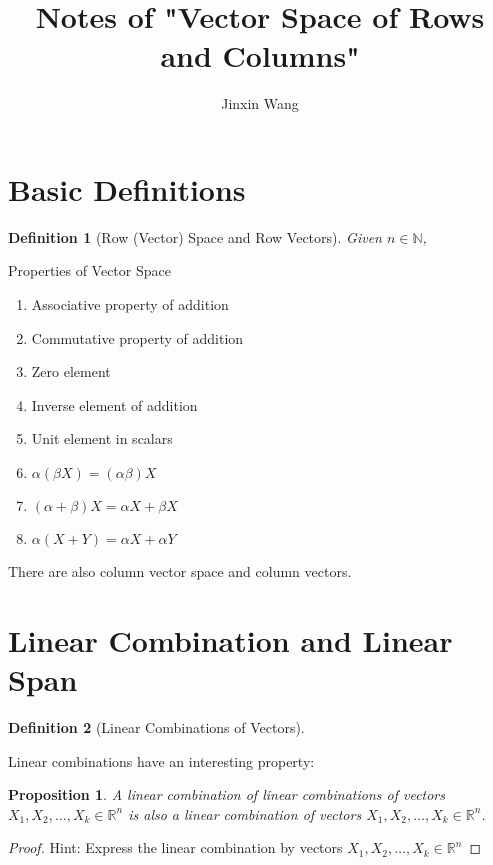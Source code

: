 \documentclass[onecolumn]{ctexart}
\title{Notes of "Vector Space of Rows and Columns"}
\author{Jinxin Wang}
\date{}
\newtheorem{definition}{Definition}
\newtheorem{proposition}{Proposition}
\begin{document}
\maketitle

\section{Basic Definitions}

\begin{definition}[Row (Vector) Space and Row Vectors]
  Given $n \in \mathbb{N}$, 
\end{definition}

Properties of Vector Space
\begin{enumerate}
  \item Associative property of addition
  \item Commutative property of addition
  \item Zero element
  \item Inverse element of addition
  \item Unit element in scalars
  \item $\alpha(\beta X) = (\alpha \beta)X$
  \item $(\alpha + \beta)X = \alpha X + \beta X$
  \item $\alpha (X + Y) = \alpha X + \alpha Y$
\end{enumerate}

There are also column vector space and column vectors.

\section{Linear Combination and Linear Span}

\begin{definition}[Linear Combinations of Vectors]
  
\end{definition}

Linear combinations have an interesting property:
\begin{proposition}
  A linear combination of linear combinations of vectors $X_1, X_2, \ldots, X_k 
  \in \mathbb{R}^n$ is also a linear combination of vectors $X_1, X_2, \ldots, 
  X_k \in \mathbb{R}^n$.
\end{proposition}
\begin{proof}
  Hint: Express the linear combination by vectors $X_1, X_2, \ldots, X_k \in 
  \mathbb{R}^n$
\end{proof}
\end{document}
